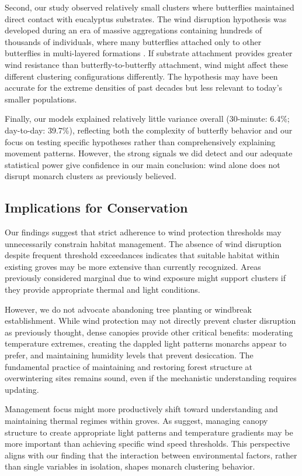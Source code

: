 Second, our study observed relatively small clusters where butterflies maintained direct contact with eucalyptus substrates. The wind disruption hypothesis was developed during an era of massive aggregations containing hundreds of thousands of individuals, where many butterflies attached only to other butterflies in multi-layered formations \parencite{leongMicroenvironmentalFactorsAssociated1990,browerMonarchButterflyClusters2008}. If substrate attachment provides greater wind resistance than butterfly-to-butterfly attachment, wind might affect these different clustering configurations differently. The hypothesis may have been accurate for the extreme densities of past decades but less relevant to today's smaller populations.

Finally, our models explained relatively little variance overall (30-minute: 6.4\%; day-to-day: 39.7\%), reflecting both the complexity of butterfly behavior and our focus on testing specific hypotheses rather than comprehensively explaining movement patterns. However, the strong signals we did detect and our adequate statistical power give confidence in our main conclusion: wind alone does not disrupt monarch clusters as previously believed.

\subsection{Implications for Conservation}

Our findings suggest that strict adherence to wind protection thresholds may unnecessarily constrain habitat management. The absence of wind disruption despite frequent threshold exceedances indicates that suitable habitat within existing groves may be more extensive than currently recognized. Areas previously considered marginal due to wind exposure might support clusters if they provide appropriate thermal and light conditions.

However, we do not advocate abandoning tree planting or windbreak establishment. While wind protection may not directly prevent cluster disruption as previously thought, dense canopies provide other critical benefits: moderating temperature extremes, creating the dappled light patterns monarchs appear to prefer, and maintaining humidity levels that prevent desiccation. The fundamental practice of maintaining and restoring forest structure at overwintering sites remains sound, even if the mechanistic understanding requires updating.

Management focus might more productively shift toward understanding and maintaining thermal regimes within groves. As \textcite{sanieeHierarchyScaleInfluence2022} suggest, managing canopy structure to create appropriate light patterns and temperature gradients may be more important than achieving specific wind speed thresholds. This perspective aligns with our finding that the interaction between environmental factors, rather than single variables in isolation, shapes monarch clustering behavior.

